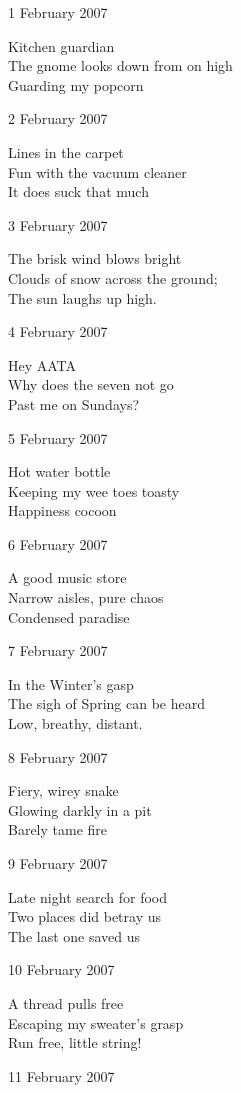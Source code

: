 \documentclass[12pt]{article}
\begin{document}
1 February 2007  

Kitchen guardian \\
The gnome looks down from on high \\
Guarding my popcorn 

2 February 2007

Lines in the carpet \\
Fun with the vacuum cleaner \\
It does suck that much 

3 February 2007

The brisk wind blows bright \\
Clouds of snow across the ground; \\
The sun laughs up high. 

4 February 2007

Hey AATA \\
Why does the seven not go \\
Past me on Sundays? 

\newpage

5 February 2007

Hot water bottle \\
Keeping my wee toes toasty \\
Happiness cocoon 

6 February 2007

A good music store \\
Narrow aisles, pure chaos \\
Condensed paradise 

7 February 2007

In the Winter's gasp \\
The sigh of Spring can be heard \\
Low, breathy, distant. 

8 February 2007

Fiery, wirey snake \\
Glowing darkly in a pit \\
Barely tame fire 

9 February 2007

Late night search for food \\
Two places did betray us \\
The last one saved us 

10 February 2007

A thread pulls free \\
Escaping my sweater's grasp \\
Run free, little string! 

11 February 2007
\end{document}
